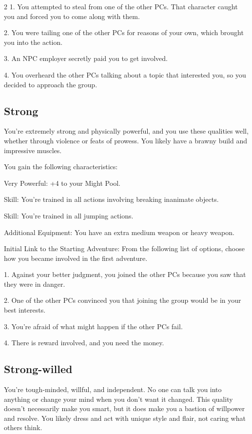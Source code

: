 \begin{multicols}{2}
1. You attempted to steal from one of the other PCs. That character caught you and forced you to come along with them.

2. You were tailing one of the other PCs for reasons of your own, which brought you into the action.

3. An NPC employer secretly paid you to get involved.

4. You overheard the other PCs talking about a topic that interested you, so you decided to approach the group.

\subsection{Strong}

You’re extremely strong and physically powerful, and you use these qualities well, whether through violence or feats of prowess. You likely have a brawny build and impressive muscles.

You gain the following characteristics:

Very Powerful: +4 to your Might Pool. 

Skill: You’re trained in all actions involving breaking inanimate objects. 

Skill: You’re trained in all jumping actions.

Additional Equipment: You have an extra medium weapon or heavy weapon.

Initial Link to the Starting Adventure: From the following list of options, choose how you became involved in the first adventure.

1. Against your better judgment, you joined the other PCs because you saw that they were in danger.

2. One of the other PCs convinced you that joining the group would be in your best interests.

3. You’re afraid of what might happen if the other PCs fail.

4. There is reward involved, and you need the money.

\subsection{Strong-willed}

You’re tough-minded, willful, and independent. No one can talk you into anything or change your mind when you don’t want it changed. This quality doesn’t necessarily make you smart, but it does make you a bastion of willpower and resolve. You likely dress and act with unique style and flair, not caring what others think.


\end{multicols}
